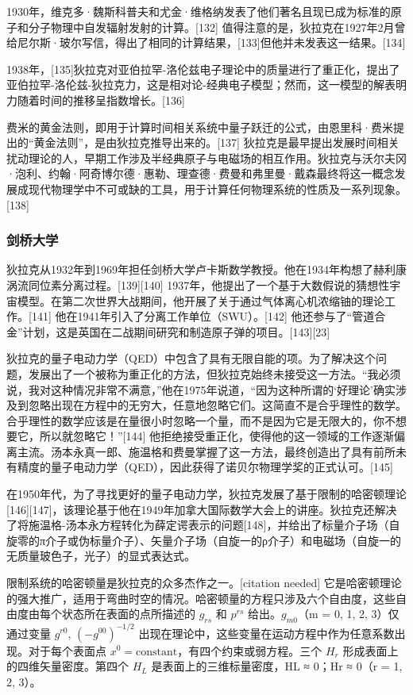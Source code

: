 1930年，维克多·魏斯科普夫和尤金·维格纳发表了他们著名且现已成为标准的原子和分子物理中自发辐射发射的计算。[132] 值得注意的是，狄拉克在1927年2月曾给尼尔斯·玻尔写信，得出了相同的计算结果，[133]但他并未发表这一结果。[134]

1938年，[135]狄拉克对亚伯拉罕-洛伦兹电子理论中的质量进行了重正化，提出了亚伯拉罕-洛伦兹-狄拉克力，这是相对论-经典电子模型；然而，这一模型的解表明力随着时间的推移呈指数增长。[136]

费米的黄金法则，即用于计算时间相关系统中量子跃迁的公式，由恩里科·费米提出的“黄金法则”，是由狄拉克推导出来的。[137] 狄拉克是最早提出发展时间相关扰动理论的人，早期工作涉及半经典原子与电磁场的相互作用。狄拉克与沃尔夫冈·泡利、约翰·阿奇博尔德·惠勒、理查德·费曼和弗里曼·戴森最终将这一概念发展成现代物理学中不可或缺的工具，用于计算任何物理系统的性质及一系列现象。[138]
\subsubsection{剑桥大学} 
狄拉克从1932年到1969年担任剑桥大学卢卡斯数学教授。他在1934年构想了赫利康涡流同位素分离过程。[139][140] 1937年，他提出了一个基于大数假说的猜想性宇宙模型。在第二次世界大战期间，他开展了关于通过气体离心机浓缩铀的理论工作。[141] 他在1941年引入了分离工作单位（SWU）。[142] 他还参与了“管道合金”计划，这是英国在二战期间研究和制造原子弹的项目。[143][23]

狄拉克的量子电动力学（QED）中包含了具有无限自能的项。为了解决这个问题，发展出了一个被称为重正化的方法，但狄拉克始终未接受这一方法。“我必须说，我对这种情况非常不满意，”他在1975年说道，“因为这种所谓的‘好理论’确实涉及到忽略出现在方程中的无穷大，任意地忽略它们。这简直不是合乎理性的数学。合乎理性的数学应该是在量很小时忽略一个量，而不是因为它是无限大的，你不想要它，所以就忽略它！”[144] 他拒绝接受重正化，使得他的这一领域的工作逐渐偏离主流。汤本永真一郎、施温格和费曼掌握了这一方法，最终创造出了具有前所未有精度的量子电动力学（QED），因此获得了诺贝尔物理学奖的正式认可。[145]

在1950年代，为了寻找更好的量子电动力学，狄拉克发展了基于限制的哈密顿理论[146][147]，该理论基于他在1949年加拿大国际数学大会上的讲座。狄拉克还解决了将施温格-汤本永方程转化为薛定谔表示的问题[148]，并给出了标量介子场（自旋零的π介子或伪标量介子）、矢量介子场（自旋一的ρ介子）和电磁场（自旋一的无质量玻色子，光子）的显式表达式。

限制系统的哈密顿量是狄拉克的众多杰作之一。[citation needed] 它是哈密顿理论的强大推广，适用于弯曲时空的情况。哈密顿量的方程只涉及六个自由度，这些自由度由每个状态所在表面的点所描述的 \( g_{rs} \) 和 \( p^{rs} \) 给出。\( g_{m0} \)（m = 0, 1, 2, 3）仅通过变量 \( g^{r0} \), \( (-g^{00})^{-1/2} \) 出现在理论中，这些变量在运动方程中作为任意系数出现。对于每个表面点 \( x^{0} = \text{constant} \)，有四个约束或弱方程。三个 \( H_{r} \) 形成表面上的四维矢量密度。第四个 \( H_{L} \) 是表面上的三维标量密度，HL ≈ 0；Hr ≈ 0（r = 1, 2, 3）。

